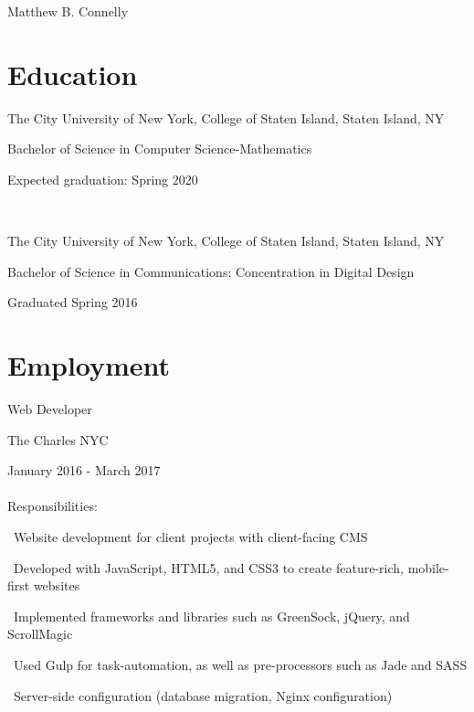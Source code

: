 \documentclass[letterpaper]{article}
\def\name{Matthew B. Connelly}
\renewenvironment{itemize}{
  \begin{list}{}{
    \setlength{\leftmargin}{1.5em}
  }
}{
  \end{list}
}
\begin{document}

\centerline{\huge \name}

\vspace{0.25in}

\section*{Education}

\begin{itemize}
  \item The City University of New York, College of Staten Island, Staten Island, NY

  Bachelor of Science in Computer Science-Mathematics

  Expected graduation: Spring 2020

  \

  \item The City University of New York, College of Staten Island, Staten Island, NY

  Bachelor of Science in Communications: Concentration in Digital Design

  Graduated Spring 2016
\end{itemize}


\section*{Employment}

\begin{itemize}
\item Web Developer

The Charles NYC

January 2016 - March 2017\\\\
Responsibilities:
  \begin{itemize}
    \item \textperiodcentered \ Website development for client projects with client-facing CMS
    \item \textperiodcentered \ Developed with JavaScript, HTML5, and CSS3 to create feature-rich, mobile-first websites
    \item \textperiodcentered \ Implemented frameworks and libraries such as GreenSock, jQuery, and ScrollMagic
    \item \textperiodcentered \ Used Gulp for task-automation, as well as pre-processors such as Jade and SASS
	\item \textperiodcentered \ Server-side configuration (database migration, Nginx configuration)
  \end{itemize}
\end{itemize}
\end{document}
